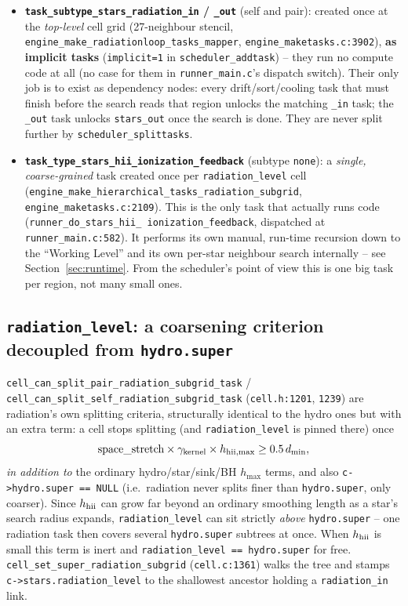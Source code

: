 \begin{itemize}
  \item \textbf{\texttt{task\_subtype\_stars\_radiation\_in} /
    \texttt{\_out}} (self and pair): created once at the
    \emph{top-level} cell grid (27-neighbour stencil,
    \texttt{engine\_make\_radiationloop\_tasks\_mapper},
    \texttt{engine\_maketasks.c:3902}), \textbf{as implicit tasks}
    (\texttt{implicit=1} in \texttt{scheduler\_addtask}) -- they run no
    compute code at all (no case for them in \texttt{runner\_main.c}'s
    dispatch switch). Their only job is to exist as dependency nodes:
    every drift/sort/cooling task that must finish before the search
    reads that region unlocks the matching \texttt{\_in} task; the
    \texttt{\_out} task unlocks \texttt{stars\_out} once the search is
    done. They are never split further by
    \texttt{scheduler\_splittasks}.
  \item \textbf{\texttt{task\_type\_stars\_hii\_ionization\_feedback}}
    (subtype \texttt{none}): a \emph{single, coarse-grained} task
    created once per \texttt{radiation\_level} cell
    (\texttt{engine\_make\_hierarchical\_tasks\_radiation\_subgrid},
    \texttt{engine\_maketasks.c:2109}). This is the only task that
    actually runs code (\texttt{runner\_do\_stars\_hii\_\allowbreak
    ionization\_feedback}, dispatched at \texttt{runner\_main.c:582}).
    It performs its own manual, run-time recursion down to the
    ``Working Level'' and its own per-star neighbour search internally
    -- see Section~\ref{sec:runtime}. From the scheduler's point of
    view this is one big task per region, not many small ones.
\end{itemize}

\subsection{\texttt{radiation\_level}: a coarsening criterion decoupled from \texttt{hydro.super}}

\texttt{cell\_can\_split\_pair\_radiation\_subgrid\_task} /
\texttt{cell\_can\_split\_self\_radiation\_subgrid\_task}
(\texttt{cell.h:1201}, \texttt{1239}) are radiation's own splitting
criteria, structurally identical to the hydro ones but with an extra
term: a cell stops splitting (and \texttt{radiation\_level} is pinned
there) once
\begin{equation}
  \text{space\_stretch} \times \gamma_{\rm kernel} \times h_{{\rm hii},\max} \ge 0.5\, d_{\min},
\end{equation}
\emph{in addition to} the ordinary hydro/star/sink/BH $h_{\max}$
terms, and also \texttt{c->hydro.super == NULL} (i.e.\ radiation never
splits finer than \texttt{hydro.super}, only coarser). Since $h_{\rm
hii}$ can grow far beyond an ordinary smoothing length as a star's
search radius expands, \texttt{radiation\_level} can sit strictly
\emph{above} \texttt{hydro.super} -- one radiation task then covers
several \texttt{hydro.super} subtrees at once. When $h_{\rm hii}$ is
small this term is inert and \texttt{radiation\_level == hydro.super}
for free. \texttt{cell\_set\_super\_radiation\_subgrid}
(\texttt{cell.c:1361}) walks the tree and stamps
\texttt{c->stars.radiation\_level} to the shallowest ancestor holding
a \texttt{radiation\_in} link.

